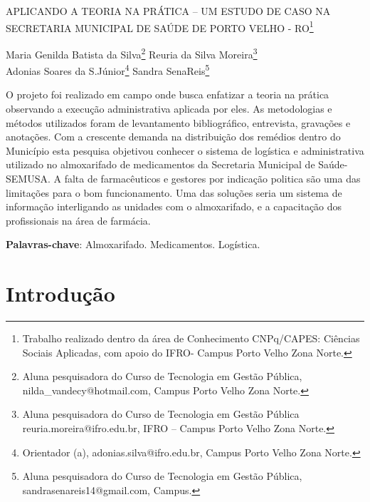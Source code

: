 \documentclass[article,12pt,onesidea,4paper,english,brazil]{abntex2}
\begin{document}
	
	
	\frenchspacing 
	
	\begin{center}
		\LARGE APLICANDO A TEORIA NA PRÁTICA – UM ESTUDO DE CASO NA SECRETARIA MUNICIPAL DE SAÚDE DE PORTO VELHO - RO\footnote{Trabalho realizado dentro da área de Conhecimento CNPq/CAPES: Ciências Sociais Aplicadas, com apoio do IFRO- Campus Porto Velho Zona Norte.}
	
	\normalsize
	Maria Genilda Batista da Silva\footnote{Aluna pesquisadora do Curso de Tecnologia em Gestão Pública, nilda\_vandecy@hotmail.com, Campus Porto Velho Zona Norte.} 
	Reuria da Silva Moreira\footnote{Aluna pesquisadora do Curso de Tecnologia em Gestão Pública reuria.moreira@ifro.edu.br, IFRO – Campus Porto Velho Zona Norte.} \\
	Adonias Soares da S.Júnior\footnote{Orientador (a), adonias.silva@ifro.edu.br, Campus Porto Velho Zona Norte.} 
	Sandra SenaReis\footnote{Aluna pesquisadora do Curso de Tecnologia em Gestão Pública, sandrasenareis14@gmail.com, Campus.} 
	\end{center}
	
\begin{resumoumacoluna}
	O projeto foi realizado em campo onde busca enfatizar a teoria na prática observando a execução administrativa aplicada por eles. As metodologias e  métodos utilizados foram de levantamento bibliográfico, entrevista, gravações e anotações. Com a crescente demanda na distribuição dos remédios dentro do Município esta pesquisa objetivou conhecer o sistema de logística e administrativa utilizado no almoxarifado de medicamentos da Secretaria Municipal de Saúde- SEMUSA. A falta de farmacêuticos e gestores por indicação politica são uma das limitações para o bom funcionamento. Uma das soluções seria um sistema de informação interligando as unidades com o almoxarifado, e a capacitação dos profissionais na área de farmácia.
	
	\vspace{\onelineskip}
	
	\noindent
	\textbf{Palavras-chave}: Almoxarifado. Medicamentos. Logística.
\end{resumoumacoluna}

\section*{Introdução}
\end{document}

